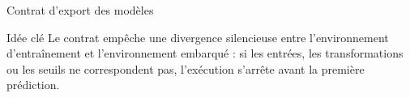 \documentclass[10pt,aspectratio=169]{beamer}
\begin{document}
\begin{frame}{Contrat d'export des modèles}
{
}

\vspace{0.35cm}

\begin{block}{Idée clé}
\small
Le contrat empêche une divergence silencieuse entre l'environnement d'entraînement et l'environnement embarqué : si les entrées, les transformations ou les seuils ne correspondent pas, l'exécution s'arrête avant la première prédiction.
\end{block}

\end{frame}
\end{document}
